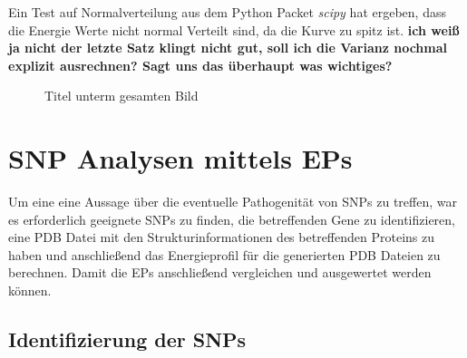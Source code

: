 Ein Test auf Normalverteilung aus dem Python Packet \emph{scipy} hat ergeben, dass die Energie Werte nicht normal Verteilt sind, da die Kurve zu spitz ist.  \textbf{ich weiß ja nicht der letzte Satz klingt nicht gut, soll ich die Varianz nochmal explizit ausrechnen? Sagt uns das überhaupt was wichtiges?}

\begin{figure} 
    \caption{Titel unterm gesamten Bild} 
    \label{fig:glu_distr}
\end{figure} 


\newpage
\section{\ac{SNP} Analysen mittels \ac{EPs}}

Um eine eine Aussage über die eventuelle Pathogenität von \ac{SNPs} zu treffen, war es erforderlich geeignete \ac{SNPs} zu finden, die betreffenden Gene zu identifizieren, eine \ac{PDB} Datei mit den Strukturinformationen des betreffenden Proteins zu haben und anschließend das Energieprofil für die generierten \ac{PDB} Dateien zu berechnen. Damit die \ac{EPs} anschließend vergleichen und ausgewertet werden können.


\subsection{Identifizierung der SNPs}

